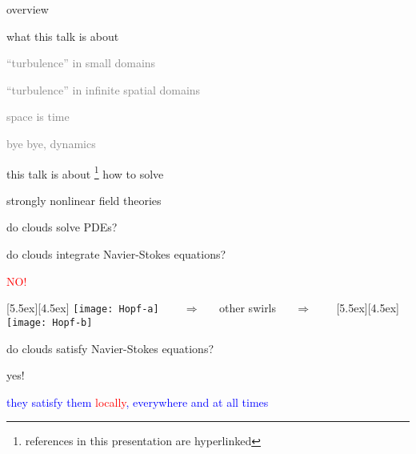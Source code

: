 \begin{frame}{overview}
\begin{enumerate}
              \item {\Large
what this talk is about
                  }\textcolor{gray}{\small
              \item
``turbulence'' in small domains
              \item
``turbulence'' in infinite spatial domains
              \item
space is time
              \item
bye bye, dynamics
                    }
            \end{enumerate}
\end{frame}

\begin{frame}{this talk is about
\footnote{references in this presentation are hyperlinked}
}
how to solve

\vfill

{\Large
strongly nonlinear field theories
                  }
\end{frame}


\begin{frame}{do clouds solve PDEs?}

do clouds integrate Navier-Stokes equations?

\begin{center}
\centerline{\textcolor{red}{\Huge NO!}}

\begin{minipage}[t]{\textwidth}
	\begin{center}
\centerline{
\raisebox{-4.0ex}[5.5ex][4.5ex]
		 {\texttt{[image: Hopf-a]}}
~~~ $\Longrightarrow$ ~~ {other swirls} ~~ $\Longrightarrow$ ~~~
	\raisebox{-4.0ex}[5.5ex][4.5ex]
		 {\texttt{[image: Hopf-b]}}
          }
	\end{center}
\end{minipage}
\end{center}

do clouds satisfy Navier-Stokes equations?

\bigskip

{\Large yes!}

\centerline{
\textcolor{blue}{they satisfy them \textcolor{red}{\large locally}, everywhere and at all times}
}
\end{frame}

